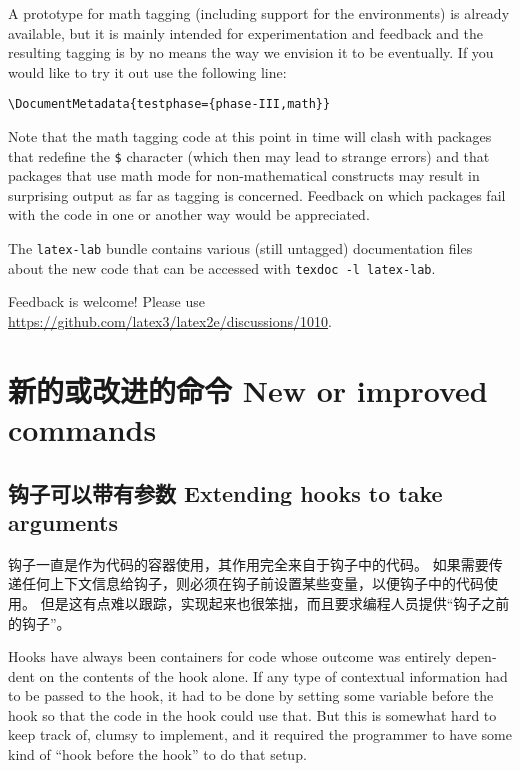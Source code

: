 \documentclass{ltnews}
\newcommand{\zhquote}[1]{“#1”}
\begin{document}
A prototype for math tagging (including support for the 
environments) is already available, but it is mainly intended for
experimentation and feedback and the resulting tagging is by no means
the way we envision it to be eventually. If you would like to try it out use
the following line:
\begin{verbatim}
\DocumentMetadata{testphase={phase-III,math}}
\end{verbatim}
Note that the math tagging code at this point in time will clash with
packages that redefine the \texttt{\$} character (which then may lead to strange
errors) and that packages that use math mode for non-mathematical
constructs may result in surprising output as far as tagging is
concerned. Feedback on which packages fail with the code in one or
another way would be appreciated.

The \texttt{latex-lab} bundle contains various 
(still untagged) documentation files about the new code that can
be accessed with \verb|texdoc -l latex-lab|.

Feedback is welcome! 
Please use \url{https://github.com/latex3/latex2e/discussions/1010}.



\section{新的或改进的命令 New or improved commands}

\subsection{钩子可以带有参数 Extending hooks to take arguments}

钩子一直是作为代码的容器使用，其作用完全来自于钩子中的代码。
如果需要传递任何上下文信息给钩子，则必须在钩子前设置某些变量，以便钩子中的代码使用。
但是这有点难以跟踪，实现起来也很笨拙，而且要求编程人员提供\zhquote{钩子之前的钩子}。

\begin{english}
Hooks have always been containers for code whose outcome was entirely
dependent on the contents of the hook alone.  If any type of contextual
information had to be passed to the hook, it had to be done by setting
some variable before the hook so that the code in the hook could use
that.  But this is somewhat hard to keep track of, clumsy to implement,
and it required the programmer to have some kind of \enquote{hook before
the hook} to do that setup.
\end{english}
\end{document}
